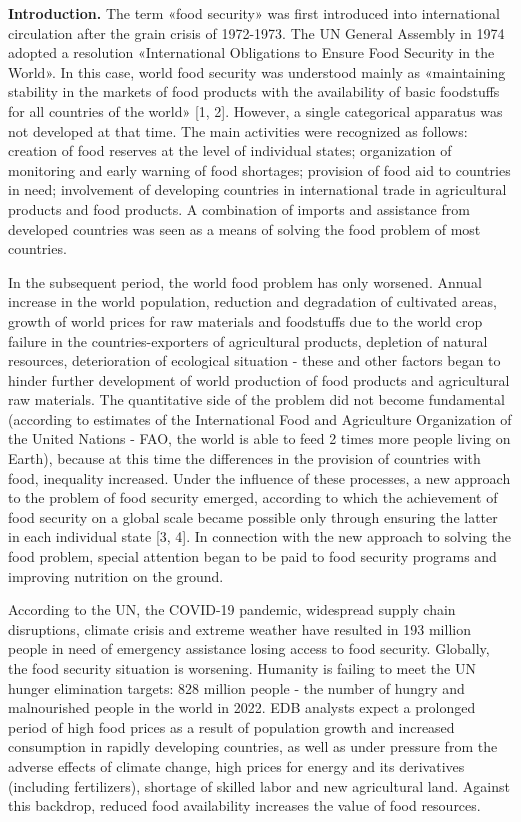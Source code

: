 \begin{multicols}{2}
{\bfseries Introduction.} The term «food security» was first introduced
into international circulation after the grain crisis of 1972-1973. The
UN General Assembly in 1974 adopted a resolution «International
Obligations to Ensure Food Security in the World». In this case, world
food security was understood mainly as «maintaining stability in the
markets of food products with the availability of basic foodstuffs for
all countries of the world» {[}1, 2{]}. However, a single categorical
apparatus was not developed at that time. The main activities were
recognized as follows: creation of food reserves at the level of
individual states; organization of monitoring and early warning of food
shortages; provision of food aid to countries in need; involvement of
developing countries in international trade in agricultural products and
food products. A combination of imports and assistance from developed
countries was seen as a means of solving the food problem of most
countries.

In the subsequent period, the world food problem has only worsened.
Annual increase in the world population, reduction and degradation of
cultivated areas, growth of world prices for raw materials and
foodstuffs due to the world crop failure in the countries-exporters of
agricultural products, depletion of natural resources, deterioration of
ecological situation - these and other factors began to hinder further
development of world production of food products and agricultural raw
materials. The quantitative side of the problem did not become
fundamental (according to estimates of the International Food and
Agriculture Organization of the United Nations - FAO, the world is able
to feed 2 times more people living on Earth), because at this time the
differences in the provision of countries with food, inequality
increased. Under the influence of these processes, a new approach to the
problem of food security emerged, according to which the achievement of
food security on a global scale became possible only through ensuring
the latter in each individual state {[}3, 4{]}. In connection with the
new approach to solving the food problem, special attention began to be
paid to food security programs and improving nutrition on the ground.

According to the UN, the COVID-19 pandemic, widespread supply chain
disruptions, climate crisis and extreme weather have resulted in 193
million people in need of emergency assistance losing access to food
security. Globally, the food security situation is worsening. Humanity
is failing to meet the UN hunger elimination targets: 828 million people
- the number of hungry and malnourished people in the world in 2022. EDB
analysts expect a prolonged period of high food prices as a result of
population growth and increased consumption in rapidly developing
countries, as well as under pressure from the adverse effects of climate
change, high prices for energy and its derivatives (including
fertilizers), shortage of skilled labor and new agricultural land.
Against this backdrop, reduced food availability increases the value of
food resources.


\end{multicols}
